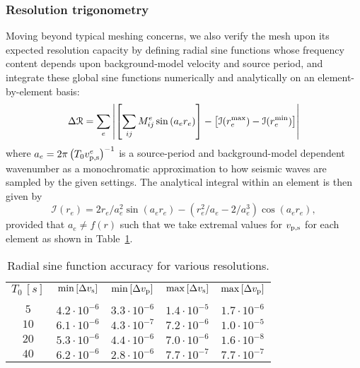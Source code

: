 \documentclass[11pt,letter,fleqn,english,notitlepage]{article}
\newcommand{\eq}{\begin{equation}} \newcommand{\en}{\end{equation}}
\begin{document}
\subsubsection{Resolution trigonometry}
%
Moving beyond typical meshing concerns, we also verify the mesh upon its 
expected resolution capacity by defining radial sine functions whose frequency 
content depends upon background-model velocity and source period, and integrate
these global sine functions numerically and analytically on an element-by-element 
basis:
%
\eq
\Delta {\mathcal R} =\sum_e \left| \left[ \sum_{ij} M_{ij}^e
\sin{\left( a_e r_e\right)}\right]-\left[ {\mathcal I} (r_e^{\rm max}) 
- {\mathcal I} (r_e^{\rm min}) \right]\right| 
\en
%
where $a_e=2\pi \left(T_0 {v_{\rm p,s}^e}\right)^{-1}$ is a source-period and background-model 
dependent wavenumber as a monochromatic approximation to how seismic waves are 
sampled by the given settings. The analytical integral within an element is then given by
%
\eq
{\mathcal I}(r_e) = 2r_e/a_e^2 \sin{(a_e r_e)} - (r_e^2/a_e - 2/a_e^3) \cos{(a_e r_e)},
\en
%
provided that $a_e\neq f(r)$ such that we take extremal values for $v_{\rm p,s}$ for 
each element as shown in Table~\ref{table:resol_sine}.
%
\begin{table}[htb!]
\label{table:resol_sine}
\begin{center}
\caption{Radial sine function accuracy for various resolutions.}
\begin{tabular}{@{}ccccc}
&&&\\
\hline\hline
$T_0\, [s]$ & $\min{\left[\Delta v_{\rm s} \right]}$ &  $\min{\left[\Delta v_{\rm p} \right]}$ 
& $\max{\left[\Delta v_{\rm s} \right]}$ &  $\max{\left[\Delta v_{\rm p} \right]}$  \\
\hline\\
$5$ &  $4.2\cdot 10^{-6}$ & $3.3\cdot 10^{-6}$  & $1.4\cdot 10^{-5}$ & $1.7\cdot 10^{-6}$ \\[10pt]
$10$ & $6.1\cdot 10^{-6}$ & $4.3\cdot 10^{-7}$ & $7.2\cdot 10^{-6}$ & $1.0\cdot 10^{-5}$   \\[10pt]
$20$ & $5.3\cdot 10^{-6}$ & $4.4\cdot 10^{-6}$ & $7.0\cdot 10^{-6}$ & $1.6\cdot 10^{-8}$    \\[10pt]
$40$ & $6.2\cdot 10^{-6}$ & $2.8\cdot 10^{-6}$ & $7.7\cdot 10^{-7}$ & $7.7\cdot 10^{-7}$    \\[10pt]
%
\hline
\end{tabular}
\end{center}
\end{table}
%
%
\end{document}
